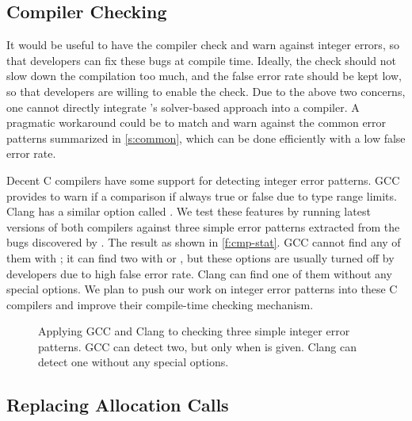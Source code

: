 
\subsection{Compiler Checking}

It would be useful to have the compiler check and warn against
integer errors, so that developers can fix these bugs
at compile time.  Ideally, the check should not slow down
the compilation too much, and the false error rate should be kept low,
so that developers are willing to enable the check.
%
Due to the above two concerns, one cannot directly integrate
\sys's solver-based approach into a compiler.  A pragmatic workaround
could be to match and warn against the common error patterns
summarized in \autoref{s:common}, which can be done efficiently
with a low false error rate.

Decent C compilers have some support for detecting integer error
patterns.
%
GCC provides  to warn if a comparison if always
true or false due to type range limits.
%
Clang has a similar option called .
%
We test these features by running latest versions of both compilers
against three simple error patterns extracted from the bugs discovered
by \sys.  The result as shown in \autoref{f:cmp-stat}.  GCC cannot
find any of them with ; it can find two with 
or , but these options are usually turned off by
developers due to high false error rate.  Clang can find one of them
without any special options.
%
%
We plan to push our work on integer error patterns into these C
compilers and improve their compile-time checking mechanism.

\begin{figure}
\centering

\caption{Applying GCC and Clang to checking three simple integer
error patterns.  GCC can detect two, but only when  is
given.  Clang can detect one without any special options.}
\label{f:cmp-stat}
\end{figure}

\subsection{Replacing Allocation Calls}

